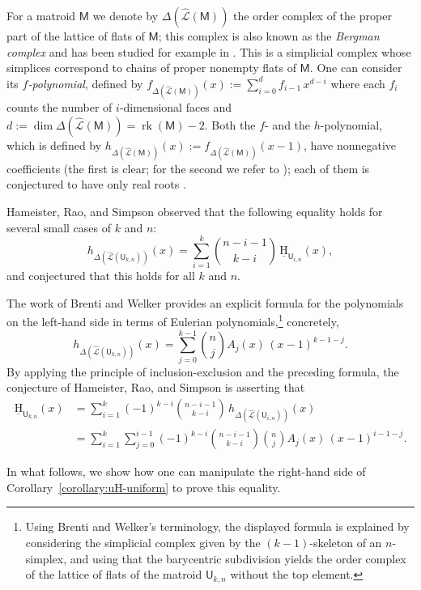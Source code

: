 \documentclass[11pt, a4paper, english]{amsart}
\theoremstyle{teoremas}
\theoremstyle{definition}
\DeclareMathOperator{\rk}{rk}
\newcommand{\M}{\mathsf{M}}
\newcommand{\U}{\mathsf{U}}
\newcommand{\uH}{\underline{\mathrm{H}}}
\begin{document}
For a matroid $\M$ we denote by $\Delta(\widehat{\mathcal{L}}(\M))$ the order complex of the proper part of the lattice of flats of $\M$; this complex is also known as the \emph{Bergman complex} and has been studied for example in \cite{ardila-klivans}. This is a simplicial complex whose simplices correspond to chains of proper nonempty flats of $\M$. One can consider its \emph{$f$-polynomial}, defined by $f_{\Delta(\widehat{\mathcal{L}}(\M))}(x) := \sum_{i=0}^d f_{i-1}\,x^{d-i}$ where each $f_i$ counts the number of $i$-dimensional faces and $d:=\dim \Delta(\widehat{\mathcal{L}}(\M))=\rk(\M)-2$. Both the $f$- and the $h$-polynomial, which is defined by $h_{\Delta(\widehat{\mathcal{L}}(\M))}(x) := f_{\Delta(\widehat{\mathcal{L}}(\M))}(x-1)$, have nonnegative coefficients (the first is clear; for the second we refer to \cite[Section 7.6]{bjorner-matroids}); each of them is conjectured to have only real roots \cite[Conjecture~1.2]{athanasiadis-kalampogia}.


Hameister, Rao, and Simpson observed that the following equality holds for several small cases of $k$ and $n$:
    \[ h_{\Delta(\widehat{\mathcal{L}}(\U_{k,n}))}(x) = \sum_{i=1}^k \binom{n-i-1}{k-i}\, \uH_{\U_{i,n}}(x),\]
and conjectured that this holds for all $k$ and $n$.

The work of Brenti and Welker \cite[Theorem~1]{brenti-welker} provides an explicit formula for the polynomials on the left-hand side in terms of Eulerian polynomials,\footnote{Using Brenti and Welker's terminology, the displayed formula is explained by considering the simplicial complex given by the $(k-1)$-skeleton of an $n$-simplex, and using that the barycentric subdivision yields the order complex of the lattice of flats of the matroid $\U_{k,n}$ without the top element.} concretely,
    \[ h_{\Delta(\widehat{\mathcal{L}}(\U_{k,n}))}(x) = \sum_{j=0}^{k-1} \binom{n}{j} A_{j}(x)\, (x-1)^{k-1-j}.\]
By applying the principle of inclusion-exclusion and the preceding formula, the conjecture of Hameister, Rao, and Simpson is asserting that 
    \begin{align}
        \uH_{\U_{k,n}}(x) &= \sum_{i=1}^k (-1)^{k-i} \binom{n-i-1}{k-i}\, h_{\Delta(\widehat{\mathcal{L}}(\U_{i,n}))}(x)\nonumber\\
        &= \sum_{i=1}^{k} \sum_{j=0}^{i-1} (-1)^{k-i} \binom{n-i-1}{k-i}  \binom{n}{j} A_{j}(x)\, (x-1)^{i-1-j}.\label{eq:hameister-rao-simspon-to-prove}
    \end{align}
    
In what follows, we show how one can manipulate the right-hand side of Corollary~\ref{corollary:uH-uniform} to prove this equality.
\end{document}
